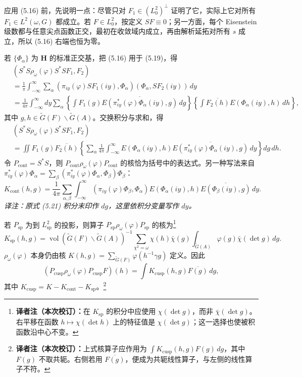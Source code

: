 应用 (5.16) 前，先说明一点：尽管只对 $F_1\in(L_0^2)^\perp$ 证明了它，实际上它对所有
$F_1\in L^2(\omega,G)$ 都成立。若 $F\in L_0^2$，按定义 $SF\equiv0$；另一方面，每个
Eisenstein 级数都与任意尖点函数正交，最初在收敛域内成立，再由解析延拓对所有 $s$ 成立，所以 (5.16) 右端也恒为零。

若 $\{\Phi_\alpha\}$ 为 $\mathbf H$ 的标准正交基，把 (5.16) 用于 (5.19)，得
\[
\begin{aligned}
 &(S^*S\rho_\omega(\varphi)S^*SF_1,F_2)\\
 &=\frac1\pi\int_{-\infty}^{\infty}\sum_\alpha
 (\pi_{iy}(\varphi)SF_1(iy),\Phi_\alpha)(\Phi_\alpha,SF_2(iy))\,dy\\
 &=\frac1{4\pi}\int_{-\infty}^{\infty}dy\sum_\alpha
 \left\{\int F_1(g)\overline{E(\pi_{iy}^*(\varphi)\Phi_\alpha(iy),g)}\,dg\right\}
 \left\{\int\overline{F_2(h)}E(\Phi_\alpha(iy),h)\,dh\right\},
\end{aligned}
\]
其中 $g,h\in\widetilde G(F)\backslash\widetilde G(A)$。交换积分与求和，得
\begin{equation}
\begin{split}
 &(S^*S\rho_\omega(\varphi)S^*SF_1,F_2)\\
 &=\iint F_1(g)\overline{F_2(h)}
 \left\{\sum_\alpha\frac1{4\pi}\int_{-\infty}^{\infty}
 E(\Phi_\alpha(iy),h)\overline{E(\pi_{iy}^*(\varphi)\Phi_\alpha(iy),g)}\,dy\right\}dg\,dh.
\end{split}\tag{5.20}
\end{equation}
令 $P_{\mathrm{cont}}=S^*S$，则 $P_{\mathrm{cont}}\rho_\omega(\varphi)P_{\mathrm{cont}}$ 的核恰为括号中的表达式。另一种写法来自
$\pi_{iy}^*(\varphi)\Phi_\alpha=
\sum_\beta(\pi_{iy}^*(\varphi)\Phi_\alpha,\Phi_\beta)\Phi_\beta$：
\begin{equation}
 K_{\mathrm{cont}}(h,g)=\frac1{4\pi}\sum_{\alpha,\beta}\int_{-\infty}^{\infty}
 (\pi_{iy}(\varphi)\Phi_\beta,\Phi_\alpha)
 E(\Phi_\alpha(iy),h)\overline{E(\Phi_\beta(iy),g)}\,dy.\tag{5.21}
\end{equation}
\noindent\textit{译注：原式 (5.21) 积分末印作 $dg$，这里依积分变量写作 $dy$。}

若 $P_{\mathrm{sp}}$ 为到 $L_{\mathrm{sp}}^2$ 的投影，则算子
$P_{\mathrm{sp}}\rho_\omega(\varphi)P_{\mathrm{sp}}$ 的核为\footnote{\textbf{译者注（本次校订）：}在 $K_{\mathrm{sp}}$ 的积分中应使用 $\chi(\det g)$，而非 $\bar\chi(\det g)$。右平移在函数 $h\mapsto\chi(\det h)$ 上的特征值是 $\chi(\det g)$；这一选择也使被积函数沿中心不变。}
\[
 K_{\mathrm{sp}}(h,g)=\operatorname{vol}(\widetilde G(F)\backslash\widetilde G(A))^{-1}
 \sum_{\chi^2=\omega}\chi(h)\bar\chi(g)
 \int_{\widetilde G(A)}\varphi(g)\bar\chi(\det g)\,dg.
\]
$\rho_\omega(\varphi)$ 本身仍由核
$K(h,g)=\sum_{\widetilde G(F)}\varphi(h^{-1}\gamma g)$ 定义。因此
\[
 (P_{\mathrm{cusp}}\rho_\omega(\varphi)P_{\mathrm{cusp}}F)(h)
 =\int K_{\mathrm{cusp}}(h,g)\overline{F(g)}\,dg,
\]
其中 $K_{\mathrm{cusp}}=K-K_{\mathrm{cont}}-K_{\mathrm{sp}}$。\footnote{\textbf{译者注（本次校订）：}上式核算子应作用为 $\int K_{\mathrm{cusp}}(h,g)F(g)\,dg$，其中 $F(g)$ 不取共轭。右侧若用 $\overline{F(g)}$，便成为共轭线性算子，与左侧的线性算子不符。}

